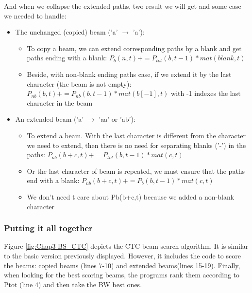 And when we collapse the extended paths, two result we will get and some case we needed to handle:
\begin{itemize}
	\item The unchanged (copied) beam ('a' $ \rightarrow $ 'a'):
	      \begin{itemize}
		      \item To copy a beam, we can extend corresponding paths by a blank and get
		            paths ending with a blank: $ P_b (n, t) += P_{tot}(b, t-1)*mat(blank, t) $
		      \item Beside, with non-blank ending paths case, if we extend it by the last
		            character (the beam is not empty): $ P_{nb}(b,t) += P_{nb}(b,t-1)*mat(b[-1],t) $
		            with -1 indexes the last character in the beam
	      \end{itemize}
	\item An extended beam ('a' $\rightarrow$ 'aa' or 'ab'):
	      \begin{itemize}
		      \item To extend a beam. With the last character is different from the character we need
		            to extend, then there is no need for separating blanks ('-') in the paths:
		            $ P_{nb}(b+c,t) += P_{tot}(b,t-1)*mat(c,t) $
		      \item Or the last character of beam is repeated, we must ensure that the paths
		            end with a blank: $ P_{nb}(b+c,t) += P_b(b,t-1)*mat(c,t) $
		      \item We don't need t care about Pb(b+c,t) because we added a non-blank character
	      \end{itemize}
\end{itemize}

\subsubsection{Putting it all together}

Figure \ref{fig:Chap3-BS_CTC} depicts the CTC beam search algorithm. It is similar to the basic version previously displayed. However, it includes the code to score the beams: copied beams (lines 7-10) and extended beams(lines 15-19). Finally, when looking for the best scoring beams, the programs rank them according to Ptot (line 4) and then take the BW best ones.

